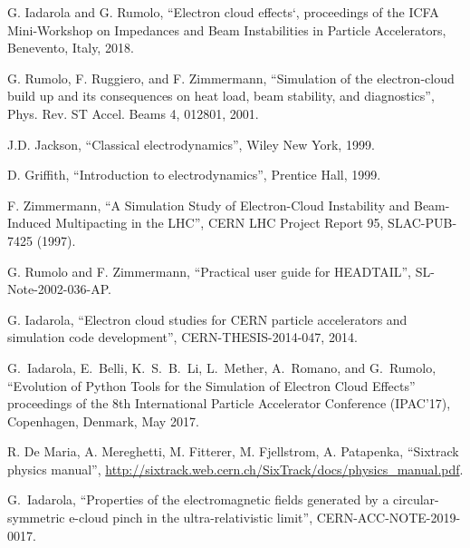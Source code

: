 \documentclass[a4paper,12pt]{report}
\begin{document}
\begin{thebibliography}{99}

 G. Iadarola and G. Rumolo, ``Electron cloud effects`, proceedings of the ICFA Mini-Workshop on Impedances and Beam Instabilities in Particle Accelerators, Benevento, Italy, 2018.

 G. Rumolo, F. Ruggiero, and F. Zimmermann, ``Simulation of the electron-cloud build up and its consequences on heat load, beam stability, and diagnostics'', Phys. Rev. ST Accel. Beams 4, 012801, 2001.

 J.D. Jackson, ``Classical electrodynamics'',  Wiley New York,  1999.

 D. Griffith, ``Introduction to electrodynamics'', Prentice Hall, 1999.

 F. Zimmermann, “A Simulation Study of Electron-Cloud Instability and Beam- Induced Multipacting in the LHC”, CERN LHC Project Report 95, SLAC-PUB- 7425 (1997).

 G. Rumolo and F. Zimmermann, ``Practical user guide for HEADTAIL'', SL-Note-2002-036-AP.

 G. Iadarola, ``Electron cloud studies for CERN particle accelerators and simulation code development'', CERN-THESIS-2014-047, 2014.

	G.~Iadarola, E.~Belli, K.~S.~B.~Li, L.~Mether, A.~Romano, and G.~Rumolo,
``Evolution of Python Tools for the Simulation of Electron Cloud Effects'' proceedings of the 8th International Particle Accelerator Conference (IPAC'17), Copenhagen, Denmark, May 2017.

 R. De Maria, A. Mereghetti, M. Fitterer, M. Fjellstrom, A. Patapenka, ``Sixtrack physics manual'', \url{http://sixtrack.web.cern.ch/SixTrack/docs/physics_manual.pdf}.

 G.~Iadarola, ``Properties of the electromagnetic fields generated by a circular-symmetric e-cloud pinch in the ultra-relativistic limit'', CERN-ACC-NOTE-2019-0017.






\end{thebibliography}
\end{document}
